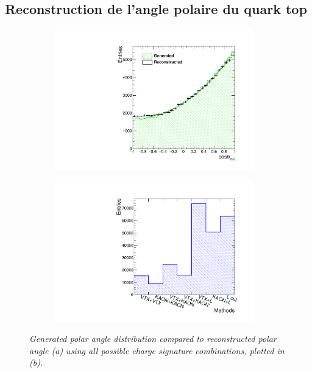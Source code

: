 
\subsection*{Reconstruction de l'angle polaire du quark top}


\begin{figure}
	\centering
	\begin{subfigure}{0.5\textwidth}
		\includegraphics[width=0.95\textwidth]{ILD/plots/top-asymmetry-lepton.pdf}
		\caption{\label{fig:TopAsymmetryChi_a_3F} }
	\end{subfigure}%
	\begin{subfigure}{0.5\textwidth}
		\centering
		\includegraphics[width=0.95\textwidth]{ILD/plots/top-methods-lepton.pdf}
		\caption{\label{fig:TopAsymmetryChi_b_3F} }
	\end{subfigure}
	\caption{\sl Generated polar angle distribution compared to reconstructed polar angle (a) using all possible charge signature combinations, plotted in (b). }
	\label{fig:TopAsymmetryChi_3F}
\end{figure}

